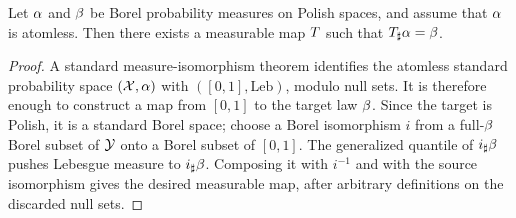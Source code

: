 \begin{prop}\label{prop-existence-transport-map-atomless}
Let $\alpha$ and $\beta$ be Borel probability measures on Polish spaces, and assume that $\alpha$ is atomless. Then there exists a measurable map $T$ such that $T_\sharp\alpha=\beta$.
\end{prop}
\begin{proof}
A standard measure-isomorphism theorem identifies the atomless standard probability space $(\mathcal{X},\alpha)$ with $([0,1],\mathrm{Leb})$, modulo null sets. It is therefore enough to construct a map from $[0,1]$ to the target law $\beta$. Since the target is Polish, it is a standard Borel space; choose a Borel isomorphism $i$ from a full-$\beta$ Borel subset of $\mathcal{Y}$ onto a Borel subset of $[0,1]$. The generalized quantile of $i_\sharp\beta$ pushes Lebesgue measure to $i_\sharp\beta$. Composing it with $i^{-1}$ and with the source isomorphism gives the desired measurable map, after arbitrary definitions on the discarded null sets.
\end{proof}
